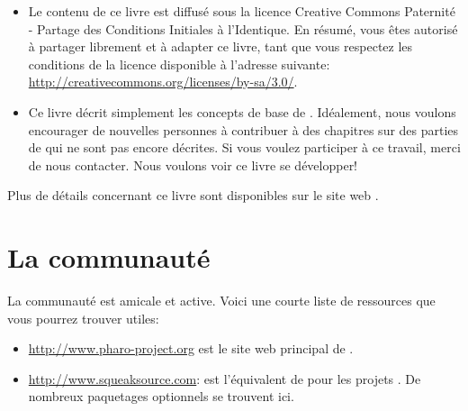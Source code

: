 \documentclass[a4paper,10pt,twoside]{book}
\begin{document}
\begin{itemize}

\item	Le contenu de ce livre est diffusé sous la licence Creative Commons Paternité - Partage des Conditions Initiales à l'Identique.
		En résumé, vous êtes autorisé à partager librement et à adapter ce livre, tant que vous respectez les conditions de la licence disponible à l'adresse suivante: 
		\url{http://creativecommons.org/licenses/by-sa/3.0/}.

\item	Ce livre décrit simplement les concepts de base de \pharo.
		Idéalement, nous voulons encourager de nouvelles personnes à contribuer à des chapitres sur des parties de \pharo qui ne sont pas encore décrites.
		Si vous voulez participer à ce travail, merci de nous contacter. Nous voulons voir ce livre se développer!
\end{itemize}

Plus de détails concernant ce livre sont disponibles sur le site web \ppe.

\section*{La communauté \pharo}

La communauté \pharo est amicale et active.
Voici une courte liste de ressources que vous pourrez trouver utiles:

\begin{itemize}
\item \url{http://www.pharo-project.org} est le site web principal de \pharo.
\item \url{http://www.squeaksource.com}: \squeaksource est l'équivalent de
  \sourceforge pour les projets \pharo. De nombreux paquetages optionnels se trouvent ici.
\end{itemize}



\end{document}
